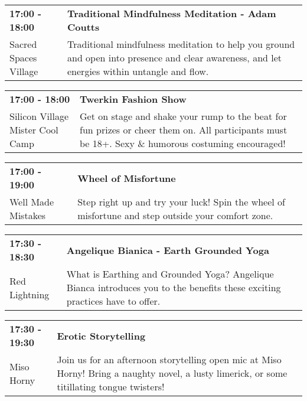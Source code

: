 \begin{tabular}{ p{1in} p{2.2in} }
    \textbf{17:00 - 18:00} & \textbf{Traditional Mindfulness Meditation - Adam Coutts} \\
    Sacred Spaces Village \newline  & Traditional mindfulness meditation to help you ground and open into presence and clear awareness, and let energies within untangle and flow. \\
    \hline 
\end{tabular}
    
\begin{tabular}{ p{1in} p{2.2in} }
    \textbf{17:00 - 18:00} & \textbf{Twerkin Fashion Show} \\
    Silicon Village \newline Mister Cool Camp & Get on stage and shake your rump to the beat for fun prizes or cheer them on. All participants must be 18+. Sexy \& humorous costuming encouraged! \\
    \hline 
\end{tabular}
    
\begin{tabular}{ p{1in} p{2.2in} }
    \textbf{17:00 - 19:00} & \textbf{Wheel of Misfortune} \\
    Well Made Mistakes \newline  & Step right up and try your luck! Spin the wheel of misfortune and step outside your comfort zone. \\
    \hline 
\end{tabular}
    
\begin{tabular}{ p{1in} p{2.2in} }
    \textbf{17:30 - 18:30} & \textbf{Angelique Bianica - Earth Grounded Yoga} \\
    Red Lightning \newline  & What is Earthing and Grounded Yoga? Angelique Bianca introduces you to the benefits these exciting practices have to offer. \\
    \hline 
\end{tabular}
    
\begin{tabular}{ p{1in} p{2.2in} }
    \textbf{17:30 - 19:30} & \textbf{Erotic Storytelling} \\
    Miso Horny \newline  & Join us for an afternoon storytelling open mic at Miso Horny! Bring a naughty novel, a lusty limerick, or some titillating tongue twisters! \\
    \hline 
\end{tabular}
    
